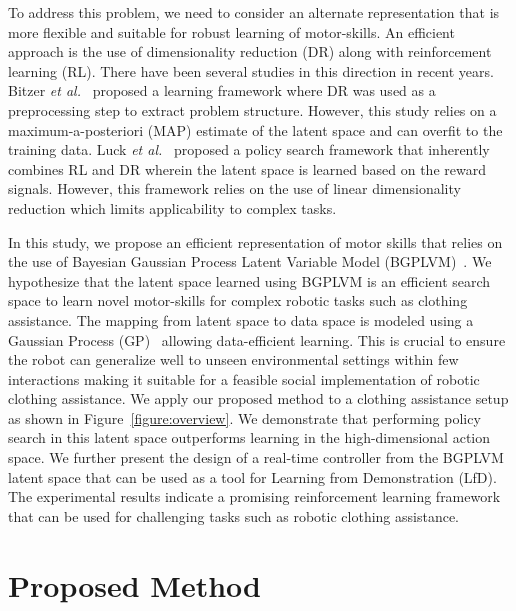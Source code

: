 \documentclass{article}
\begin{document}
To address this problem, we need to consider an alternate representation that is more flexible and suitable for robust learning of motor-skills. An efficient approach is the use of dimensionality reduction (DR) along with reinforcement learning (RL). There have been several studies in this direction in recent years. Bitzer \emph{et al.}~\cite{bitzer} proposed a learning framework where DR was used as a preprocessing step to extract problem structure. However, this study relies on a maximum-a-posteriori (MAP) estimate of the latent space and can overfit to the training data. Luck \emph{et al.}~\cite{luck} proposed a policy search framework that inherently combines RL and DR wherein the latent space is learned based on the reward signals. However, this framework relies on the use of linear dimensionality reduction which limits applicability to complex tasks.

In this study, we propose an efficient representation of motor skills that relies on the use of Bayesian Gaussian Process Latent Variable Model (BGPLVM)~\cite{bgplvm}. We hypothesize that the latent space learned using BGPLVM is an efficient search space to learn novel motor-skills for complex robotic tasks such as clothing assistance. The mapping from latent space to data space is modeled using a Gaussian Process (GP)~\cite{gp} allowing data-efficient learning. This is crucial to ensure the robot can generalize well to unseen environmental settings within few interactions making it suitable for a feasible social implementation of robotic clothing assistance. We apply our proposed method to a clothing assistance setup as shown in Figure~\ref{figure:overview}. We demonstrate that performing policy search in this latent space outperforms learning in the high-dimensional action space. We further present the design of a real-time controller from the BGPLVM latent space that can be used as a tool for Learning from Demonstration (LfD). The experimental results indicate a promising reinforcement learning framework that can be used for challenging tasks such as robotic clothing assistance.

\section{Proposed Method}
\label{section:method}
\end{document}
